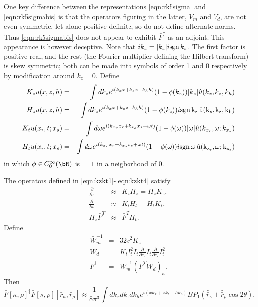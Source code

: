 One key difference between the representations \ref{eqn:rk5sigma} and
\ref{eqn:rk5sigmabis} is that the operators figuring in the latter,
$V_m$ and $V_d$, are not even symmetric, let alone positive definite,
so do not define alternate norms. Thus \ref{eqn:rk5sigmabis} does not
appear to exhibit $\bar{F}^{\dagger}$ as an adjoint. This appearance
is however deceptive. Note that $ik_z = |k_z|i{\rm sgn}\,k_z$. The
first factor is positive real, and the rest (the
Fourier multiplier defining the Hilbert transform)  is skew symmetric;
both can be made into symbols of order 1 and 0 respectively by
modification around $k_z=0$.  Define
\begin{eqnarray}
\label{eqn:kzkt1} 
K_zu(x,z,h) &=& \int dk_z e^{i(k_xx+k_z z+k_hh)}
                (1-\phi(k_z))|k_z|\hat{u}(k_x,k_z,k_h)\\
\label{eqn:kzkt2} 
H_zu(x,z,h) &=& \int dk_z e^{i(k_xx+k_z z+k_hh)}
                (1-\phi(k_z))i\rm{sgn}\,k_z\,\hat{u}(k_x,k_z,k_h)\\
\label{eqn:kzkt3} 
K_tu(x_r,t;x_s) &=& \int d\omega e^{i(k_{x_r} x_r+k_{x_s} x_s+\omega
                    t)}
                    (1-\phi(\omega))|\omega|\hat{u}(k_{x_r},\omega;k_{x_s}) \\
\label{eqn:kzkt4} 
H_tu(x_r,t;x_s) &=& \int d\omega e^{i(k_{x_r} x_r+k_{x_s} x_s+\omega
                    t)}
                    (1-\phi(\omega))i\rm{sgn}\,\omega\,\hat{u}(k_{x_r},\omega;k_{x_s}) 
\end{eqnarray}
in which $\phi \in C^{\infty}_0(\bR)$ is $=1$ in a neigborhood of
$0$. 
\begin{theorem} The operators defined in
  \ref{eqn:kzkt1}-\ref{eqn:kzkt4}  satisfy
\begin{eqnarray}
\frac{\partial}{\partial z} & \approx& K_z H_z = H_z K_z, \nonumber \\
\frac{\partial}{\partial t} &\approx& K_t H_t = H_t K_t, \nonumber\\
H_z \bar{F}^T &\approx& \bar{F}^T H_t.
\label{eqn:kzkt5}
\end{eqnarray}
Define 
\begin{eqnarray}
\label{eqn:defbarWm}
\bar{W}_m^{-1} &=& 32 v^2 K_z \\
\label{eqn:defbarWd}
\bar{W}_d & = & K_t I_t^2 I_t\frac{\partial}{\partial 
  z_s}I_t\frac{\partial}{\partial z_r}I_t^2\\
\label{eqn:defdd}
\bar{F}^{\ddagger} &=& \bar{W}_m^{-1}
(\bar{F}^T\bar{W}_d)_{\kappa}.
\end{eqnarray}
Then
\begin{equation}
\label{eqn:rk6sigmaterce}
\bar{F}[\kappa,\rho]^{\ddagger}\bar{F}[\kappa,\rho][\bar{r}_{\kappa},\bar{r}_{\rho}]
\approx  
\frac{1}{8 \pi^3}\int dk_x dk_z dk_h e^{i(xk_{x}+zk_{z}+hk_{h})}B P_1
 (\hat{\bar{r}}_{\kappa} + \hat{\bar{r}}_{\rho} \cos 2 \theta ) .
\end{equation}
\end{theorem}
